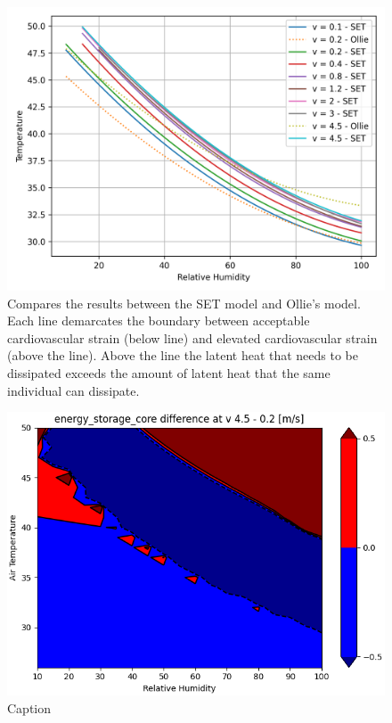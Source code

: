 \begin{figure}
    \centering
    \includegraphics[width=\textwidth]{figures/comparison_air_speed.png}
    \caption{Compares the results between the SET model and Ollie's model.
    Each line demarcates the boundary between acceptable cardiovascular strain (below line) and elevated cardiovascular strain (above the line).
    Above the line the latent heat that needs to be dissipated exceeds the amount of latent heat that the same individual can dissipate. }
    \label{fig:comparison_air_speed}
\end{figure}

\begin{figure}
    \centering
    \includegraphics[width=\textwidth]{figures/energy_storage_delta.png}
    \caption{Caption}
    \label{fig:energy_storage_delta}
\end{figure}


